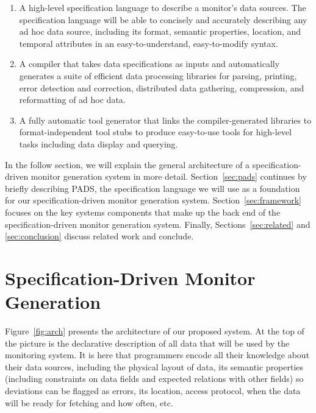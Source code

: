 \documentclass{sigplanconf}
\begin{document}
\begin{enumerate}

\item A high-level specification language to describe a monitor's
data sources.  The specification language will be able to
concisely and accurately describing any ad hoc data source,
including its format, semantic properties, location, and
temporal attributes in an easy-to-understand, easy-to-modify syntax.

\item A compiler that takes data specifications as inputs and
automatically generates a suite of 
efficient data processing libraries for parsing, printing, error detection
and correction, distributed data gathering, compression, and 
reformatting of ad hoc data.

\item A fully automatic tool generator that links the compiler-generated 
libraries to format-independent tool stubs to produce easy-to-use 
tools for high-level tasks including data display and querying.

\end{enumerate}

\begin{figure*}[t]
\begin{center}
\centerline{}
\end{center}
\caption{\label{fig:arch} Architecture of Specification-Driven Monitor Generator.
}
\end{figure*}

In the follow section, we will explain 
the general architecture of a specification-driven monitor generation system
in more detail.
Section~\ref{sec:pads} continues by briefly describing PADS, the specification language
we will use as a foundation for our specification-driven monitor generation system.
Section~\ref{sec:framework} focuses on the key systems components that make up the back end of
the specification-driven monitor generation system.  Finally,
Sections~\ref{sec:related} and \ref{sec:conclusion} discuss related work and
conclude.

\section{Specification-Driven Monitor Generation}
\label{sec:architecture}

Figure~\ref{fig:arch} presents the architecture of our proposed
system.  At the top of the picture is the declarative description of all
data that will be used by the monitoring system.  It is here that
programmers encode all their knowledge about their data sources,
including the physical layout of data, its semantic properties
(including constraints on data fields and expected relations
with other fields) so deviations can be flagged as errors, 
its location, access protocol, when the data
will be ready for fetching and how often, etc.
\end{document}
